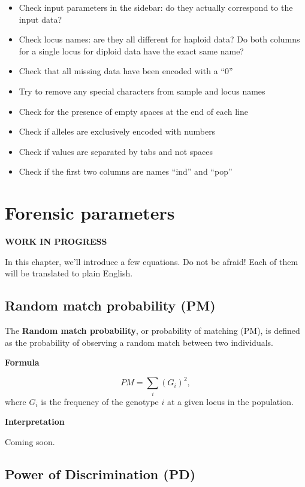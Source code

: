 \documentclass[
  a5paper]{book}
\providecommand{\tightlist}{%
  \setlength{\itemsep}{0pt}\setlength{\parskip}{0pt}}
\begin{document}
\begin{itemize}
\tightlist
\item
  Check input parameters in the sidebar: do they actually correspond to the input data?
\item
  Check locus names: are they all different for haploid data? Do both columns for a single locus for diploid data have the exact same name?
\item
  Check that all missing data have been encoded with a ``0''
\item
  Try to remove any special characters from sample and locus names
\item
  Check for the presence of empty spaces at the end of each line
\item
  Check if alleles are exclusively encoded with numbers
\item
  Check if values are separated by tabs and not spaces
\item
  Check if the first two columns are names ``ind'' and ``pop''
\end{itemize}

\hypertarget{forensic-parameters}{%
\chapter{Forensic parameters}\label{forensic-parameters}}

\textbf{WORK IN PROGRESS}

In this chapter, we'll introduce a few equations. Do not be afraid! Each of them will
be translated to plain English.

\hypertarget{random-match-probability-pm}{%
\section{Random match probability (PM)}\label{random-match-probability-pm}}

The \textbf{Random match probability}, or probability of matching (PM), is defined as
the probability of observing a random match between two individuals.

\textbf{Formula}

\[
PM = \sum_i (G_i)^2,
\]
where \(G_i\) is the frequency of the genotype \(i\) at a given locus in the population.

\textbf{Interpretation}

Coming soon.

\hypertarget{power-of-discrimination-pd}{%
\section{Power of Discrimination (PD)}\label{power-of-discrimination-pd}}
\end{document}
